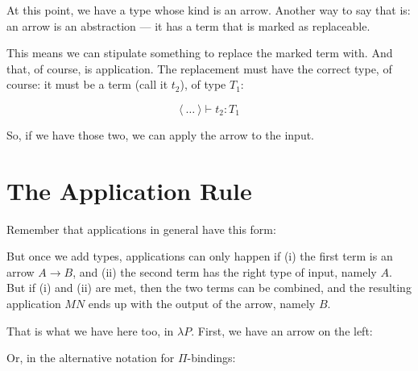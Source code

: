 \documentclass{book}
\numberwithin{equation}{chapter}
\begin{document}
\noindent
At this point, we have a type whose kind is an arrow. Another way to say that is: an arrow is an abstraction --- it has a term that is marked as replaceable.

This means we can stipulate something to replace the marked term with. And that, of course, is application. The replacement must have the correct type, of course: it must be a term (call it $t_{2}$), of type $T_{1}$:

\begin{equation}
\langle~\ldots~\rangle \vdash t_{2} : T_{1}
\end{equation}

\noindent
So, if we have those two, we can apply the arrow to the input. 


\section{The Application Rule}

Remember that applications in general have this form:

\begin{prooftree}
\end{prooftree}

\noindent
But once we add types, applications can only happen if (i) the first term is an arrow $A \rightarrow B$, and (ii) the second term has the right type of input, namely $A$. But if (i) and (ii) are met, then the two terms can be combined, and the resulting application $MN$ ends up with the output of the arrow, namely $B$.

\begin{prooftree}
\end{prooftree}

\noindent
That is what we have here too, in $\lambda P$. First, we have an arrow on the left:

\begin{prooftree}
\end{prooftree}

\noindent
Or, in the alternative notation for $\Pi$-bindings:
\end{document}

